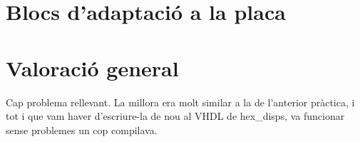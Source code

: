   \cclearpage
\section{Blocs d'adaptació a la placa}

\section{Valoració general}

Cap problema rellevant. La millora era molt similar a la de l'anterior pràctica,
i tot i que vam haver d'escriure-la de nou al VHDL de \textsf{hex\_disps}, va
funcionar sense problemes un cop compilava.
